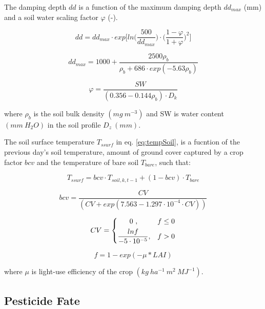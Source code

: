 \documentclass[]{article}
\begin{document}
The damping depth \(dd\) is a function of the maximum damping depth
\(dd_{max}\) (mm) and a soil water scaling factor \(\varphi\) (-).

\begin{equation}
dd = dd_{max} \cdot exp \Big[ln\Big(\frac{500}{dd_{max}} \Big) \cdot \Big(\frac{1-\varphi}{1+\varphi}\Big)^2\Big]
\label{eq:dd} 
\end{equation}

\begin{equation} 
dd_{max} = 1000 + \frac{2500\rho_b}{\rho_b+686 \cdot exp(-5.63\rho_b)}
\label{eq:ddmax} 
\end{equation}

\begin{equation} 
\varphi = \frac{SW}{(0.356-0.144\rho_b) \cdot D_{k}}
\label{eq:varphi} 
\end{equation}

where \(\rho_b\) is the soil bulk density \((mg~m^{-3})\) and SW is
water content \((mm~H_2O)\) in the soil profile \(D_z~(mm)\).

The soil surface temperature \(T_{ssurf}\) in eq. \ref{eq:tempSoil}, is
a fucntion of the previous day's soil temperature, amount of ground
cover captured by a crop factor \(bcv\) and the temperature of bare soil
\(T_{bare}\), such that:

\begin{equation} 
T_{ssurf} = bcv \cdot  T_{soil, k, t-1} + (1-bcv) \cdot T_{bare}
\label{eq:Tssurf} 
\end{equation}

\begin{equation} 
bcv = \frac{CV}{(CV+exp(7.563-1.297 \cdot 10^{-4} \cdot CV))}
\label{eq:Tssurf} 
\end{equation}

\begin{equation} 
    CV = 
\begin{dcases}
     ~~~~~0~,                                     & f \leq 0 \\
    \frac{lnf}{-5\cdot10^{-5}},              & f > 0 
\end{dcases}
\end{equation}

\begin{equation} 
f=1-exp(-\mu*LAI)
\label{eq:f} 
\end{equation}

where \(\mu\) is light-use efficiency of the crop
\((kg~ha^{-1}~m^2~MJ^{-1})\).

\hypertarget{pesticide-fate}{%
\subsection{Pesticide Fate}\label{pesticide-fate}}
\end{document}
